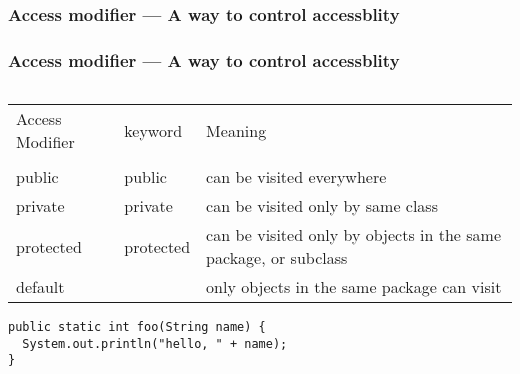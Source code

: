 \documentclass[en, 11pt, xcolor=dvipsnames]{beamer}
\begin{document}
\subsubsection{Access modifier --- A way to control accessblity}
\begin{frame}[fragile]
	\frametitle{Access modifier --- A way to control accessblity}


	\begin{columns}[c]
		\begin{column}{0.9\textwidth}

			\begin{table}
				\begin{center}
					\begin{tabular}[c]{l l l}
						Access Modifier & keyword   & Meaning                                                         \\ \\
						public          & public    & can be visited everywhere                                       \\
						private         & private   & can be visited only by same class                               \\
						protected       & protected & can be visited only by objects in the same package, or subclass \\
						default         &           & only objects in the same package can visit                      \\
					\end{tabular}
				\end{center}
			\end{table}

			\begin{lstlisting}[style=Java]
public static int foo(String name) {
  System.out.println("hello, " + name);
}
      \end{lstlisting}
		\end{column}
	\end{columns}

\end{frame}
\end{document}

